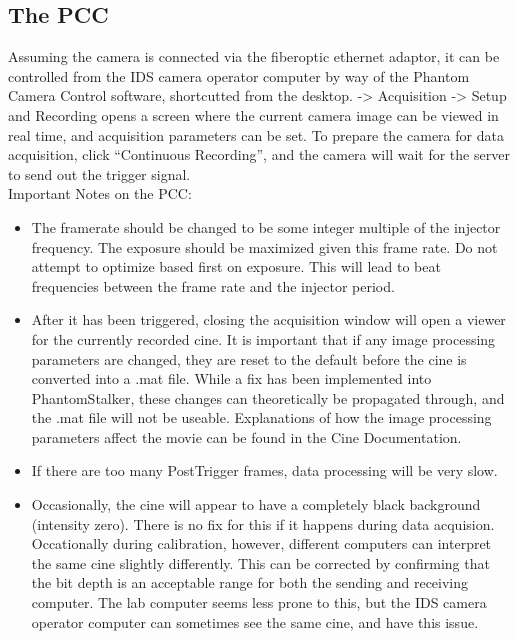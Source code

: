 \documentclass[twoside]{article}
\begin{document}
\subsection{The PCC}Assuming the camera is connected via the fiberoptic ethernet adaptor, it can be controlled from the IDS camera operator computer by way of the Phantom Camera Control software, shortcutted from the desktop. -> Acquisition -> Setup and Recording opens a screen where the current camera image can be viewed in real time, and acquisition parameters can be set. To prepare the camera for data acquisition, click “Continuous Recording”, and the camera will wait for the server to send out the trigger signal. \\
Important Notes on the PCC:
\begin{itemize}
	\item The framerate should be changed to be some integer multiple of the injector frequency. The exposure should be maximized given this frame rate. Do not attempt to optimize based first on exposure. This will lead to beat frequencies between the frame rate and the injector period.
	\item After it has been triggered, closing the acquisition window will open a viewer for the currently recorded cine. It is important that if any image processing parameters are changed, they are reset to the default before the cine is converted into a .mat file. While a fix has been implemented into PhantomStalker, these changes can theoretically be propagated through, and the .mat file will not be useable. Explanations of how the image processing parameters affect the movie can be found in the Cine Documentation.
	\item If there are too many PostTrigger frames, data processing will be very slow.
	\item Occasionally, the cine will appear to have a completely black background (intensity zero). There is no fix for this if it happens during data acquision. Occationally during calibration, however, different computers can interpret the same cine slightly differently. This can be corrected by confirming that the bit depth is an acceptable range for both the sending and receiving computer. The lab computer seems less prone to this, but the IDS camera operator computer can sometimes see the same cine, and have this issue. 
\end{itemize}
\end{document}

